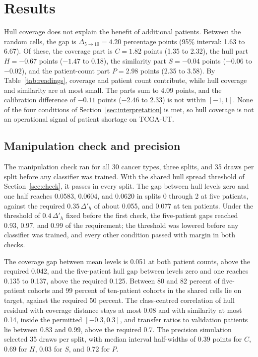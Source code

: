 \section{Results}
\label{sec:results}
Hull coverage does not explain the benefit of additional patients. Between the random cells, the gap is $\Delta_{5\to10}=4.20$ percentage points (95\% interval: 1.63 to 6.67). Of these, the coverage part is $C=1.82$ points (1.35 to 2.32), the hull part $H=-0.67$ points ($-1.47$ to 0.18), the similarity part $S=-0.04$ points ($-0.06$ to $-0.02$), and the patient-count part $P=2.98$ points (2.35 to 3.58). By Table~\ref{tab:readings}, coverage and patient count contribute, while hull coverage and similarity are at most small. The parts sum to 4.09 points, and the calibration difference of $-0.11$ points ($-2.46$ to 2.33) is not within $[-1,1]$. None of the four conditions of Section~\ref{sec:interpretation} is met, so hull coverage is not an operational signal of patient shortage on TCGA-UT.

\subsection{Manipulation check and precision}
\label{sec:check-results}
The manipulation check ran for all 30 cancer types, three splits, and 35 draws per split before any classifier was trained. With the shared hull spread threshold of Section~\ref{sec:check}, it passes in every split. The gap between hull levels zero and one half reaches 0.0583, 0.0604, and 0.0620 in splits 0 through 2 at five patients, against the required $0.35\,\Delta'_h$ of about 0.055, and 0.077 at ten patients. Under the threshold of $0.4\,\Delta'_h$ fixed before the first check, the five-patient gaps reached 0.93, 0.97, and 0.99 of the requirement; the threshold was lowered before any classifier was trained, and every other condition passed with margin in both checks.

The coverage gap between mean levels is 0.051 at both patient counts, above the required 0.042, and the five-patient hull gap between levels zero and one reaches 0.135 to 0.137, above the required 0.125. Between 80 and 82 percent of five-patient cohorts and 99 percent of ten-patient cohorts in the shared cells lie on target, against the required 50 percent. The class-centred correlation of hull residual with coverage distance stays at most 0.08 and with similarity at most 0.14, inside the permitted $[-0.3,0.3]$, and transfer ratios to validation patients lie between 0.83 and 0.99, above the required 0.7. The precision simulation selected 35 draws per split, with median interval half-widths of 0.39 points for $C$, 0.69 for $H$, 0.03 for $S$, and 0.72 for $P$.

